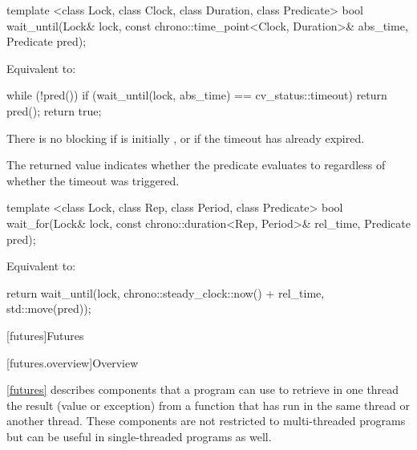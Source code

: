 %
%
\begin{itemdecl}
template <class Lock, class Clock, class Duration, class Predicate>
  bool wait_until(Lock& lock, const chrono::time_point<Clock, Duration>& abs_time, Predicate pred);
\end{itemdecl}

\begin{itemdescr}
\pnum
\effects Equivalent to:
\begin{codeblock}
while (!pred())
  if (wait_until(lock, abs_time) == cv_status::timeout)
    return pred();
return true;
\end{codeblock}

\pnum
\enternote There is no blocking if  is initially , or
if the timeout has already expired. \exitnote

\pnum
\enternote The returned value indicates whether the predicate evaluates to 
regardless of whether the timeout was triggered. \exitnote
\end{itemdescr}

%
%
\begin{itemdecl}
template <class Lock, class Rep, class Period, class Predicate>
  bool wait_for(Lock& lock, const chrono::duration<Rep, Period>& rel_time, Predicate pred);
\end{itemdecl}

\begin{itemdescr}
\pnum
\effects Equivalent to:

\begin{codeblock}
return wait_until(lock, chrono::steady_clock::now() + rel_time, std::move(pred));
\end{codeblock}
\end{itemdescr}

[futures]{Futures}

[futures.overview]{Overview}

\pnum
\ref{futures} describes components that a \Cpp program can use to retrieve in one thread the
result (value or exception) from a function that has run in the same thread or another thread.
\enternote These components are not restricted to multi-threaded programs but can be useful in
single-threaded programs as well. \exitnote

